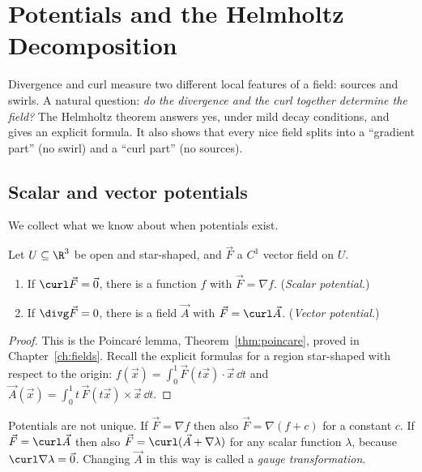 \chapter{Potentials and the Helmholtz Decomposition}
\label{ch:helmholtz}

Divergence and curl measure two different local features of a field: sources and swirls. A natural question: \emph{do the divergence and the curl together determine the field?} The Helmholtz theorem answers yes, under mild decay conditions, and gives an explicit formula. It also shows that every nice field splits into a ``gradient part'' (no swirl) and a ``curl part'' (no sources).

\section{Scalar and vector potentials}

We collect what we know about when potentials exist.

\begin{theorem}\label{thm:potentials}
Let $U\subseteq\R^3$ be open and star-shaped, and $\vec F$ a $C^1$ vector field on $U$.
\begin{enumerate}[label=(\alph*)]
  \item If $\curl\vec F=\vec0$, there is a function $f$ with $\vec F=\nabla f$. (\emph{Scalar potential.})
  \item If $\divg\vec F=0$, there is a field $\vec A$ with $\vec F=\curl\vec A$. (\emph{Vector potential.})
\end{enumerate}
\end{theorem}

\begin{proof}
This is the Poincar\'e lemma, Theorem~\ref{thm:poincare}, proved in Chapter~\ref{ch:fields}. Recall the explicit formulas for a region star-shaped with respect to the origin: $f(\vec x)=\int_0^1\vec F(t\vec x)\cdot\vec x\,\dd t$ and $\vec A(\vec x)=\int_0^1t\,\vec F(t\vec x)\times\vec x\,\dd t$.
\end{proof}

Potentials are not unique. If $\vec F=\nabla f$ then also $\vec F=\nabla(f+c)$ for a constant $c$. If $\vec F=\curl\vec A$ then also $\vec F=\curl(\vec A+\nabla\lambda)$ for any scalar function $\lambda$, because $\curl\nabla\lambda=\vec0$. Changing $\vec A$ in this way is called a \emph{gauge transformation}.

